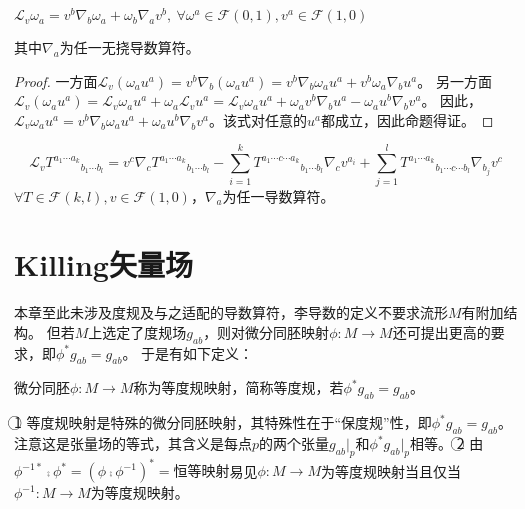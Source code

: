 \begin{theorem}
$\mathscr{L}_v\omega_a = v^b\nabla_b\omega_a + \omega_b\nabla_av^b, ~ \forall \omega^a \in \mathscr{F}(0, 1), v^a \in \mathscr{F}(1, 0)$

其中$\nabla_a$为任一无挠导数算符。
\end{theorem}

\begin{proof}
一方面$\mathscr{L}_v(\omega_au^a) = v^b\nabla_b(\omega_au^a) = v^b\nabla_b\omega_au^a + v^b\omega_a\nabla_bu^a$。
另一方面$\mathscr{L}_v(\omega_au^a) = \mathscr{L}_v\omega_au^a + \omega_a\mathscr{L}_vu^a = \mathscr{L}_v\omega_au^a + \omega_av^b\nabla_bu^a - \omega_au^b\nabla_bv^a$。
因此，$\mathscr{L}_v\omega_au^a = v^b\nabla_b\omega_au^a + \omega_au^b\nabla_bv^a$。该式对任意的$u^a$都成立，因此命题得证。
\end{proof}

\begin{theorem}
$$\mathscr{L}_vT^{a_1 \cdots a_k}{}_{b_1 \cdots b_l} = v^c\nabla_cT^{a_1 \cdots a_k}{}_{b_1 \cdots b_l} - \sum^k_{i = 1}T^{a_1 \cdots c \cdots a_k}{}_{b_1 \cdots b_l}\nabla_cv^{a_i} + \sum^l_{j = 1}T^{a_1 \cdots a_k}{}_{b_1 \cdots c \cdots b_l}\nabla_{b_j}v^c$$
$\forall T \in \mathscr{F}(k, l), v \in \mathscr{F}(1, 0)$，$\nabla_a$为任一导数算符。
\end{theorem}

\section{Killing矢量场}

本章至此未涉及度规及与之适配的导数算符，李导数的定义不要求流形$M$有附加结构。
但若$M$上选定了度规场$g_{ab}$，则对微分同胚映射$\phi \colon M \to M$还可提出更高的要求，即$\phi^*g_{ab} = g_{ab}$。
于是有如下定义：

\begin{definition}
微分同胚$\phi \colon M \to M$称为等度规映射，简称等度规，若$\phi^*g_{ab} = g_{ab}$。
\end{definition}

\begin{note}
\textcircled{1} 等度规映射是特殊的微分同胚映射，其特殊性在于``保度规''性，即$\phi^*g_{ab} = g_{ab}$。
注意这是张量场的等式，其含义是每点$p$的两个张量$g_{ab}|_p$和$\phi^*g_{ab}|_p$相等。
\textcircled{2} 由$\phi^{-1*} \comp \phi^* = (\phi \comp \phi^{-1})^* = \text{恒等映射}$易见$\phi \colon M \to M$为等度规映射当且仅当$\phi^{-1} \colon M \to M$为等度规映射。
\end{note}

